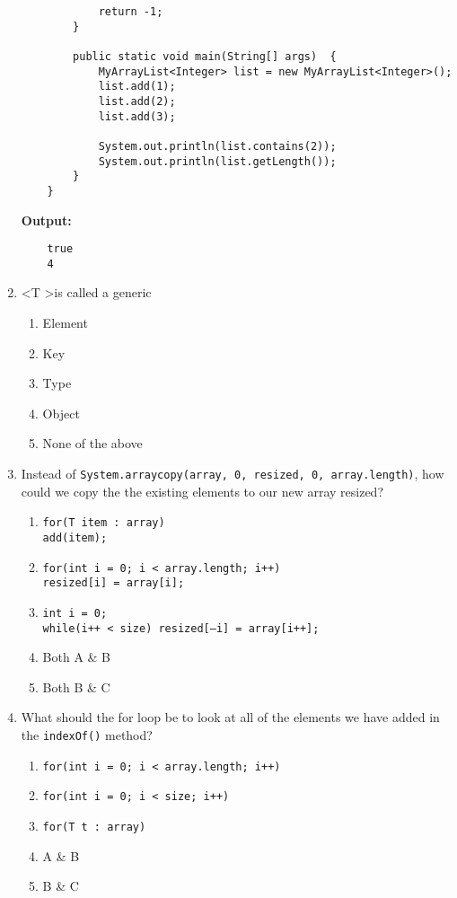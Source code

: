 \documentclass[S17-Final.tex]{subfiles}
\begin{document}
\begin{enumerate}
\begin{lstlisting}
            return -1;
        } 
        
        public static void main(String[] args)  {
            MyArrayList<Integer> list = new MyArrayList<Integer>();
            list.add(1);
            list.add(2);
            list.add(3);
            
            System.out.println(list.contains(2));
            System.out.println(list.getLength());
        }
    }
\end{lstlisting}

\textbf{Output:}
\begin{lstlisting}
    true
    4
\end{lstlisting}
\clearpage
\item \textless T \textgreater is called a generic
	
\begin{enumerate}
\item  Element
\item  Key
\item  Type
\item  Object
\item  None of the above
\end{enumerate}

\item Instead of \texttt{System.arraycopy(array, 0, resized, 0, array.length)}, how could we copy the the existing elements to our new array resized?
	
\begin{enumerate}
\item  \texttt{for(T item : array)\\
        add(item);}
\item  \texttt{for(int i = 0; i < array.length; i++)\\
     resized[i] = array[i];}
\item  \texttt{int i = 0;\\
  while(i++ < size)
     resized[--i] = array[i++];}
\item  Both A \& B
\item  Both B \& C
\end{enumerate}

\item What should the for loop be to look at all of the elements we have added in the \texttt{indexOf()} method?
	
\begin{enumerate}
\item  \texttt{for(int i = 0; i < array.length; i++)}
\item  \texttt{for(int i = 0; i < size; i++)}
\item  \texttt{for(T t : array)}
\item  A \& B
\item  B \& C
\end{enumerate}


\end{enumerate}
\end{document}
